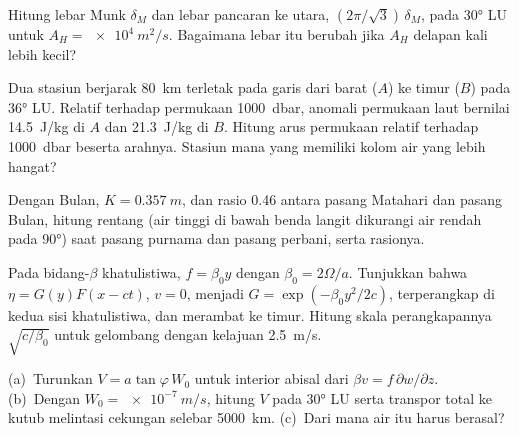 \begin{exercise}[$\star\star$]\label{exo:b3:ocean-dynamics:7}
Hitung lebar Munk $\delta_M$ dan lebar pancaran ke utara,
$(2\pi/\sqrt3)\,\delta_M$, pada \ang{30} LU untuk $A_H = \qty{e4}{m^2/s}$. Bagaimana
lebar itu berubah jika $A_H$ delapan kali lebih kecil?
\end{exercise}

\begin{exercise}[$\star\star$]\label{exo:b3:ocean-dynamics:8}
Dua stasiun berjarak \qty{80}{km} terletak pada garis dari barat ($A$) ke timur
($B$) pada \ang{36} LU. Relatif terhadap permukaan \qty{1000}{dbar}, anomali
 permukaan laut bernilai \qty{14.5}{J/kg} di $A$ dan
\qty{21.3}{J/kg} di $B$. Hitung arus permukaan relatif terhadap
\qty{1000}{dbar} beserta arahnya. Stasiun mana yang memiliki kolom
air yang lebih hangat?
\end{exercise}

\begin{exercise}[$\star\star$]\label{exo:b3:ocean-dynamics:9}
Dengan  Bulan, $K = \qty{0.357}{m}$, dan rasio
\num{0.46} antara pasang Matahari dan pasang Bulan, hitung rentang
 (air tinggi di bawah benda langit dikurangi air rendah pada \ang{90}) saat pasang purnama dan
pasang perbani, serta rasionya.
\end{exercise}

\begin{exercise}[$\star\star\star$]\label{exo:b3:ocean-dynamics:10}
Pada bidang-$\beta$ khatulistiwa, $f = \beta_0y$ dengan $\beta_0 =
2\Omega/a$. Tunjukkan bahwa  $\eta = G(y)F(x - ct)$, $v = 0$,
menjadi $G = \exp(-\beta_0y^2/2c)$, terperangkap di kedua sisi khatulistiwa,
dan merambat ke timur. Hitung skala perangkapannya $\sqrt{c/\beta_0}$ untuk
gelombang dengan kelajuan \qty{2.5}{m/s}.
\end{exercise}

\begin{exercise}[$\star\star\star$]\label{exo:b3:ocean-dynamics:11}
(a)~Turunkan $V = a\tan\varphi\,W_0$ untuk interior abisal dari $\beta v =
f\,\partial w/\partial z$. (b)~Dengan $W_0 = \qty{e-7}{m/s}$, hitung $V$ pada
\ang{30} LU serta transpor total ke kutub melintasi cekungan
selebar \qty{5000}{km}. (c)~Dari mana air itu harus berasal?
\end{exercise}

